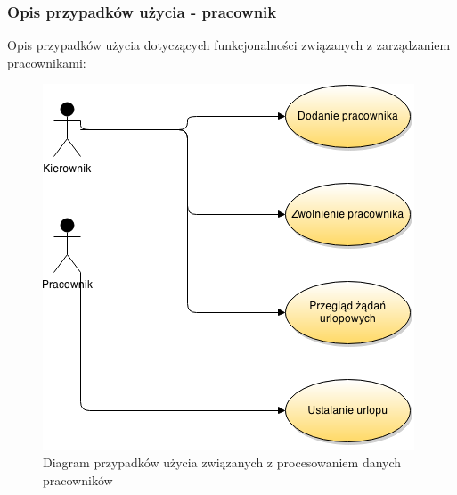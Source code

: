 \subsubsection{Opis przypadków użycia - pracownik}

Opis przypadków użycia dotyczących funkcjonalności związanych z zarządzaniem
pracownikami:

\begin{figure}[h!]
    \includegraphics[width=\textwidth,
    height=0.5\textheight]{graphics/UseCase/Pracownik/UseCaseDiagram.png}
  \caption{Diagram przypadków użycia związanych z procesowaniem danych
  pracowników}
\end{figure}

\begin{enumerate}
	
	
	  
	
	
	
\end{enumerate}
